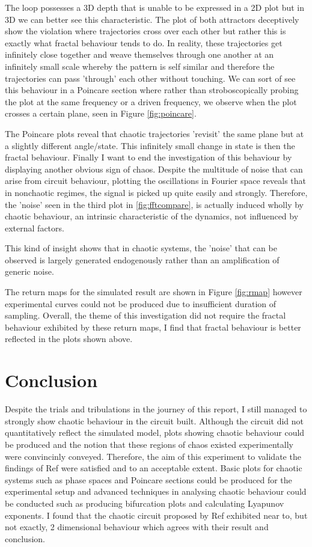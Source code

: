 \documentclass[aps,prl,reprint,10pt,amsmath,amssymb,superscriptaddress,a4paper]{revtex4-2}
\begin{document}
The loop possesses a 3D depth that is unable to be expressed in a 2D plot but in 3D we can better see this characteristic. The plot of both attractors deceptively show the violation where trajectories cross over each other but rather this is exactly what fractal 
behaviour tends to do. In reality, these trajectories get infinitely close together and weave themselves through one another at an infinitely small scale whereby the pattern is self similar and therefore the trajectories can pass 'through' each other without touching.
We can sort of see this behaviour in a Poincare section where rather than stroboscopically probing the plot at the same frequency or a driven frequency, we observe when the plot crosses a certain plane, seen in Figure \ref{fig:poincare}.

The Poincare plots reveal that chaotic trajectories 'revisit' the same plane but at a slightly different angle/state. This infinitely small change in state is then the fractal behaviour. Finally I want to end the investigation of this behaviour by displaying another 
obvious sign of chaos. Despite the multitude of noise that can arise from circuit behaviour, plotting the oscillations in Fourier space reveals that in nonchaotic regimes, the signal is picked up quite easily and strongly. Therefore, the 'noise' seen in the third plot 
in \ref{fig:fftcompare}, is actually induced wholly by chaotic behaviour, an intrinsic characteristic of the dynamics, not influenced by external factors.

This kind of insight shows that in chaotic systems, the 'noise' that can be observed is largely generated endogenously rather than an amplification of generic noise.

The return maps for the simulated result are shown in Figure \ref{fig:rmap} however experimental curves could not be produced due to insufficient duration of sampling. Overall, the theme of this investigation did not require the fractal behaviour exhibited by these return 
maps, I find that fractal behaviour is better reflected in the plots shown above.

\section{Conclusion}

Despite the trials and tribulations in the journey of this report, I still managed to strongly show chaotic behaviour in the circuit built. Although the circuit did not quantitatively reflect the simulated model, plots showing chaotic behaviour could be produced and the 
notion that these regions of chaos existed experimentally were convincinly conveyed. Therefore, the aim of this experiment to validate the findings of Ref \citep{baker} were satisfied and to an acceptable extent. Basic plots for chaotic systems such as phase spaces and 
Poincare sections could be produced for the experimental setup and advanced techniques in analysing chaotic behaviour could be conducted such as producing bifurcation plots and calculating Lyapunov exponents. I found that the chaotic circuit proposed by Ref \citep{baker} 
exhibited near to, but not exactly, 2 dimensional behaviour which agrees with their result and conclusion.
\end{document}
